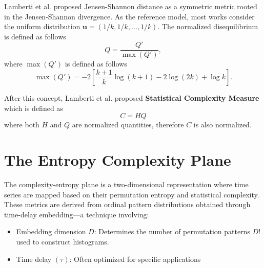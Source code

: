 Lamberti et al. \cite{lamberti2004intensive} proposed Jensen-Shannon distance as a symmetric metric rooted in the Jensen-Shannon divergence. As the reference model, most works consider the uniform distribution $\mathbf{u}=(1/k,1/k, \dots, 1/k)$. The normalized disequilibrium is defined as follows
\begin{equation}
	Q=\dfrac{Q'}{\max{(Q')}},
\end{equation}
where $\max(Q')$ is defined as follows
\begin{equation}
	\max(Q')=-2 \left[\dfrac{k+1}{k}\log(k+1)-2\log(2k)+\log k\right].
\end{equation}

After this concept, Lamberti et al. \cite{lamberti2004intensive} proposed \textbf{Statistical Complexity Measure} which is defined as 
\begin{equation}
	C=HQ
\end{equation}
where both $H$ and $Q$ are normalized quantities, therefore $C$ is also normalized. 
  
\section{The Entropy Complexity Plane}
The complexity-entropy plane is a two-dimensional representation where time series are mapped based on their permutation entropy and statistical complexity. These metrics are derived from ordinal pattern distributions obtained through time-delay embedding—a technique involving:
\begin{itemize}
	\item Embedding dimension $D$: Determines the number of permutation patterns $D!$ used to construct histograms.
	\item Time delay $(\tau)$: Often optimized for specific applications 
\end{itemize} 


